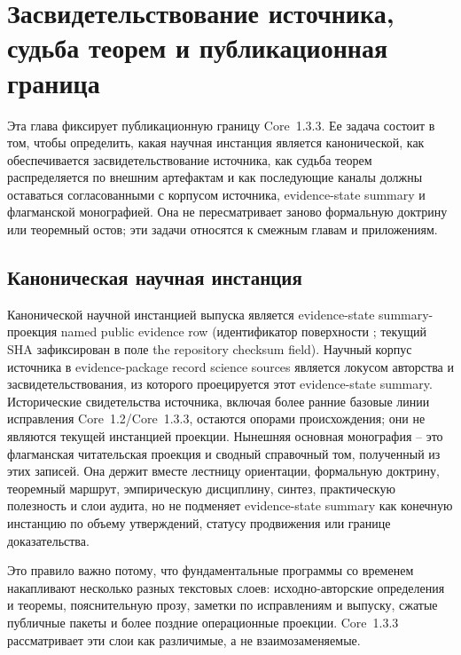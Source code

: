\section{Засвидетельствование источника, судьба теорем и публикационная граница}
\label{sec:oc13-publication-boundary}

Эта глава фиксирует публикационную границу Core~1.3.3. Ее задача состоит в том,
чтобы определить, какая научная инстанция является канонической, как
обеспечивается засвидетельствование источника, как судьба теорем
распределяется по внешним артефактам и как последующие каналы должны
оставаться согласованными с корпусом источника, evidence-state summary и флагманской
монографией. Она не пересматривает заново формальную доктрину или теоремный
остов; эти задачи относятся к смежным главам и приложениям.

\subsection{Каноническая научная инстанция}

Канонической научной инстанцией выпуска является evidence-state summary-проекция
named public evidence row
(идентификатор поверхности ; текущий SHA
зафиксирован в поле the repository checksum field). Научный корпус источника в
evidence-package record science sources является локусом
авторства и засвидетельствования, из которого проецируется этот evidence-state summary.
Исторические свидетельства источника, включая более ранние базовые линии
исправления Core~1.2/Core~1.3.3, остаются опорами происхождения; они не являются
текущей инстанцией проекции. Нынешняя основная монография -- это флагманская
читательская проекция и сводный справочный том, полученный из этих записей.
Она держит вместе лестницу ориентации, формальную доктрину, теоремный маршрут,
эмпирическую дисциплину, синтез, практическую полезность и слои аудита, но не
подменяет evidence-state summary как конечную инстанцию по объему утверждений, статусу
продвижения или границе доказательства.

Это правило важно потому, что фундаментальные программы со временем накапливают
несколько разных текстовых слоев: исходно-авторские определения и теоремы,
пояснительную прозу, заметки по исправлениям и выпуску, сжатые публичные пакеты
и более поздние операционные проекции. Core~1.3.3 рассматривает эти слои как
различимые, а не взаимозаменяемые.


